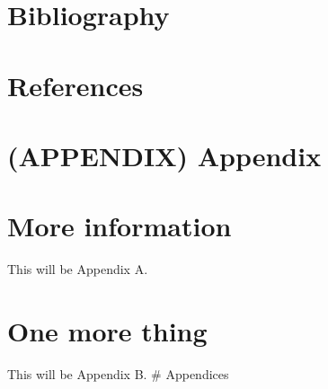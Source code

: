 \documentclass[
]{article}
\newlength{\cslhangindent}
\newlength{\cslentryspacingunit} %
\newenvironment{CSLReferences}[2] %
 {%
  \setlength{\parindent}{0pt}
  \ifodd #1
  \let\oldpar\par
  \def\par{\hangindent=\cslhangindent\oldpar}
  \fi
  \setlength{\parskip}{#2\cslentryspacingunit}
 }%
 {}
\begin{document}
\newpage

\hypertarget{bibliography-1}{%
\section{Bibliography}\label{bibliography-1}}

\hypertarget{references}{%
\section{References}\label{references}}

\hypertarget{refs}{}
\begin{CSLReferences}{0}{0}
\end{CSLReferences}

\hypertarget{appendix-appendix}{%
\section*{(APPENDIX) Appendix}\label{appendix-appendix}}

\hypertarget{more-information}{%
\section{More information}\label{more-information}}

This will be Appendix A.

\hypertarget{one-more-thing}{%
\section{One more thing}\label{one-more-thing}}

This will be Appendix B. \# Appendices
\end{document}
